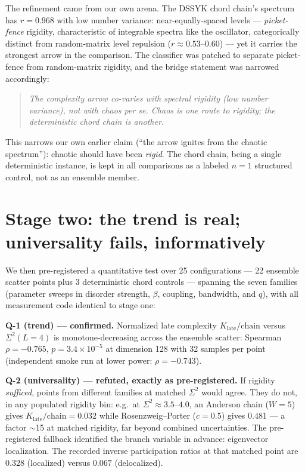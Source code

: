 \documentclass[11pt]{article}
\newcommand{\Klate}{K_{\mathrm{late}}}
\newcommand{\Svar}{\Sigma^2}
\begin{document}
The refinement came from our own arena. The DSSYK chord chain's spectrum has
$r=0.968$ with low number variance: near-equally-spaced levels ---
\emph{picket-fence} rigidity, characteristic of integrable spectra like the
oscillator, categorically distinct from random-matrix level repulsion
($r\approx0.53$--$0.60$) --- yet it carries the strongest arrow in the
comparison. The classifier was patched to separate picket-fence from
random-matrix rigidity, and the bridge statement was narrowed accordingly:
\begin{quote}
\emph{The complexity arrow co-varies with spectral rigidity (low number
variance), not with chaos per se. Chaos is one route to rigidity; the
deterministic chord chain is another.}
\end{quote}
This narrows our own earlier claim (``the arrow ignites from the chaotic
spectrum''): chaotic should have been \emph{rigid}. The chord chain, being a
single deterministic instance, is kept in all comparisons as a labeled $n=1$
structured control, not as an ensemble member.

\section{Stage two: the trend is real; universality fails, informatively}

We then pre-registered a quantitative test over 25 configurations --- 22
ensemble scatter points plus 3 deterministic chord controls --- spanning the
seven families (parameter sweeps in disorder strength, $\beta$, coupling,
bandwidth, and $q$), with all measurement code identical to stage one:

\textbf{Q-1 (trend) --- confirmed.} Normalized late complexity
$\Klate/\mathrm{chain}$ versus $\Svar(L{=}4)$ is monotone-decreasing across
the ensemble scatter: Spearman $\rho=-0.765$, $p=3.4\times10^{-5}$ at
dimension 128 with 32 samples per point (independent smoke run at lower power:
$\rho=-0.743$).

\textbf{Q-2 (universality) --- refuted, exactly as pre-registered.} If
rigidity \emph{sufficed}, points from different families at matched $\Svar$
would agree. They do not, in any populated rigidity bin: e.g.\ at
$\Svar\approx3.5$--$4.0$, an Anderson chain ($W{=}5$) gives
$\Klate/\mathrm{chain}=0.032$ while Rosenzweig--Porter ($c{=}0.5$) gives
$0.481$ --- a factor $\sim$15 at matched rigidity, far beyond combined
uncertainties. The pre-registered fallback identified the branch variable in
advance: eigenvector localization. The recorded inverse participation ratios
at that matched point are $0.328$ (localized) versus $0.067$ (delocalized).
\end{document}
